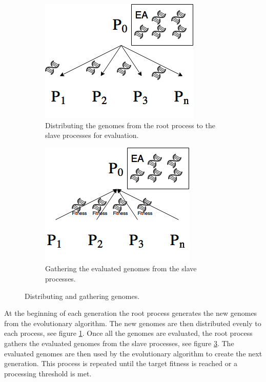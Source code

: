 \begin{figure}[H]
	\centering
	\begin{subfigure}[t]{0.45\textwidth}
		\centering
		\includegraphics[scale=0.5]{chapters/res/mpi-distribute.png}
		\caption{Distributing the genomes from the root process to the slave processes for evaluation.}
		\label{fig:distribute-genomes}
	\end{subfigure}
	\begin{subfigure}[t]{0.45\textwidth}
		\centering
		\includegraphics[scale=0.5]{chapters/res/mpi-gather.png}
		\caption{Gathering the evaluated genomes from the slave processes.}
		\label{fig:gather-genomes}
	\end{subfigure}
	\caption{Distributing and gathering genomes.}
\end{figure}
At the beginning of each generation the root process generates the new genomes from the evolutionary algorithm.
The new genomes are then distributed evenly to each process, see figure \ref{fig:distribute-genomes}.
Once all the genomes are evaluated, the root process gathers the evaluated genomes from the slave processes, see figure \ref{fig:gather-genomes}.
The evaluated genomes are then used by the evolutionary algorithm to create the next generation.
This process is repeated until the target fitness is reached or a processing threshold is met.
